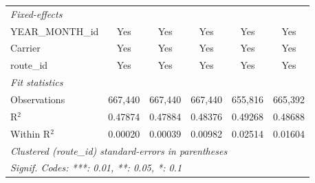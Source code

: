 \documentclass[preprint,12pt,authoryear]{elsarticle}
\begin{document}
\begin{table}[htbp]
\begin{tabular}{lccccc}
      \midrule
      \emph{Fixed-effects}\\
      YEAR\_MONTH\_id                   & Yes             & Yes             & Yes             & Yes             & Yes\\  
      Carrier                           & Yes             & Yes             & Yes             & Yes             & Yes\\  
      route\_id                         & Yes             & Yes             & Yes             & Yes             & Yes\\  
      \midrule
      \emph{Fit statistics}\\
      Observations                      & 667,440         & 667,440         & 667,440         & 655,816         & 665,392\\  
      R$^2$                             & 0.47874         & 0.47884         & 0.48376         & 0.49268         & 0.48688\\  
      Within R$^2$                      & 0.00020         & 0.00039         & 0.00982         & 0.02514         & 0.01604\\  
      \midrule \midrule
      \multicolumn{6}{l}{\emph{Clustered (route\_id) standard-errors in parentheses}}\\
      \multicolumn{6}{l}{\emph{Signif. Codes: ***: 0.01, **: 0.05, *: 0.1}}\\
   \end{tabular}
\end{table}
\FloatBarrier
\end{document}
